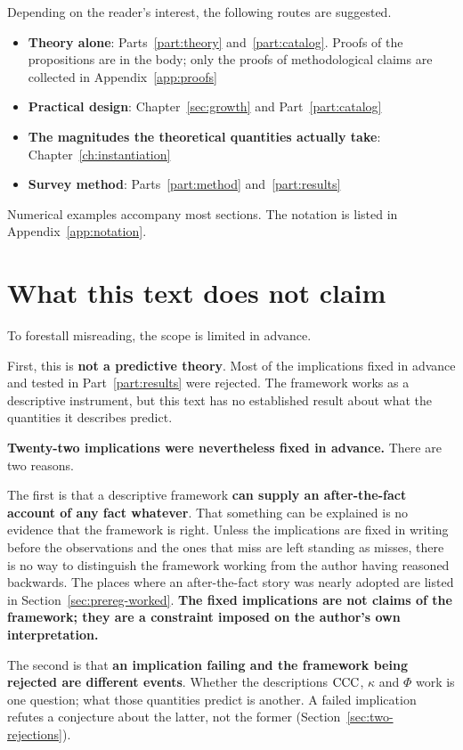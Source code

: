 Depending on the reader's interest, the following routes are suggested.

\begin{itemize}
\item \textbf{Theory alone}: Parts~\ref{part:theory} and~\ref{part:catalog}.
Proofs of the propositions are in the body; only the proofs of methodological claims are
collected in Appendix~\ref{app:proofs}
\item \textbf{Practical design}: Chapter~\ref{sec:growth} and Part~\ref{part:catalog}
\item \textbf{The magnitudes the theoretical quantities actually take}: Chapter~\ref{ch:instantiation}
\item \textbf{Survey method}: Parts~\ref{part:method} and~\ref{part:results}
\end{itemize}

Numerical examples accompany most sections. The notation is listed in
Appendix~\ref{app:notation}.

\section{What this text does not claim}

To forestall misreading, the scope is limited in advance.

First, this is \textbf{not a predictive theory}. Most of the implications fixed in advance
and tested in Part~\ref{part:results} were rejected. The framework works as a descriptive
instrument, but this text has no established result about what the quantities it describes
predict.

\textbf{Twenty-two implications were nevertheless fixed in advance.} There are two reasons.

The first is that a descriptive framework \textbf{can supply an after-the-fact account of
any fact whatever}. That something can be explained is no evidence that the framework is
right. Unless the implications are fixed in writing before the observations and the ones
that miss are left standing as misses, there is no way to distinguish the framework working
from the author having reasoned backwards. The places where an after-the-fact story was
nearly adopted are listed in Section~\ref{sec:prereg-worked}.
\textbf{The fixed implications are not claims of the framework; they are a constraint
imposed on the author's own interpretation.}

The second is that \textbf{an implication failing and the framework being rejected are
different events}. Whether the descriptions $\mathrm{CCC}$, $\kappa$ and $\Phi$ work is one
question; what those quantities predict is another. A failed implication refutes a
conjecture about the latter, not the former (Section~\ref{sec:two-rejections}).

